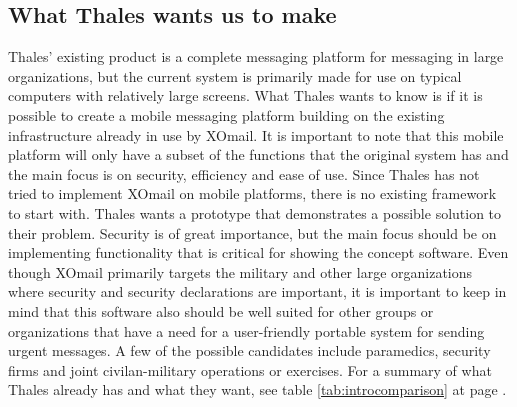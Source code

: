 \subsection*{What Thales wants us to make}
Thales’ existing product is a complete messaging platform for messaging in large organizations, but the current system is primarily made for use on typical computers with relatively large screens. What Thales wants to know is if it is possible to create a mobile messaging platform building on the existing infrastructure already in use by XOmail. It is important to note that this mobile platform will only have a subset of the functions that the original system has and the main focus is on security, efficiency and ease of use.
\newline
\newline
Since Thales has not tried to implement XOmail on mobile platforms, there is no existing framework to start with. Thales wants a prototype that demonstrates a possible solution to their problem. Security is of great importance, but the main focus should be on implementing functionality that is critical for showing the concept software.  
\newline
\newline
Even though XOmail primarily targets the military and other large organizations where security and security declarations are important, it is important to keep in mind that this software also should be well suited for other groups or organizations that have a need for a user-friendly portable system for sending urgent messages. A few of the possible candidates include paramedics, security firms and joint civilan-military operations or exercises.
\newline
\newline
For a summary of what Thales already has and what they want, see table \ref{tab:introcomparison} at page \pageref{tab:introcomparison}.

